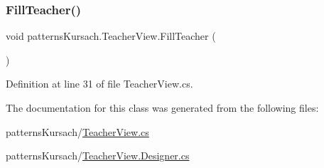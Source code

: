 \mbox{\label{classpatterns_kursach_1_1_teacher_view_aa56a700da1d0c37ca75abe74eb466b92}} 
\subsubsection{\texorpdfstring{Fill\+Teacher()}{FillTeacher()}}
{\footnotesize\ttfamily void patterns\+Kursach.\+Teacher\+View.\+Fill\+Teacher (\begin{DoxyParamCaption}{ }\end{DoxyParamCaption})}



Definition at line 31 of file Teacher\+View.\+cs.



The documentation for this class was generated from the following files\+:\begin{DoxyCompactItemize}
\item 
patterns\+Kursach/\mbox{\hyperlink{_teacher_view_8cs}{Teacher\+View.\+cs}}\item 
patterns\+Kursach/\mbox{\hyperlink{_teacher_view_8_designer_8cs}{Teacher\+View.\+Designer.\+cs}}\end{DoxyCompactItemize}
